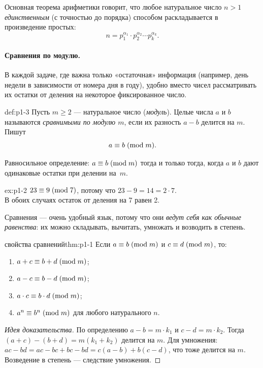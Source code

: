 Основная теорема арифметики говорит, что любое натуральное число $n > 1$ \emph{единственным} (с точностью до порядка) способом раскладывается в произведение простых:
\[
n = p_1^{\alpha_1} \cdot p_2^{\alpha_2} \cdots p_k^{\alpha_k}.
\]

\paragraph*{Сравнения по модулю.} В каждой задаче, где важна только «остаточная» информация (например, день недели в зависимости от номера дня в году), удобно вместо чисел рассматривать их остатки от деления на некоторое фиксированное число.

\begin{definition}{}{def:p1-3}
Пусть $m \ge 2$ --- натуральное число (\emph{модуль}). Целые числа $a$ и $b$ называются \emph{сравнимыми по модулю $m$}, если их разность $a - b$ делится на $m$. Пишут
\[
a \equiv b \;(\mathrm{mod}\;m).
\]
\end{definition}

\noindent
Равносильное определение: $a \equiv b \;(\mathrm{mod}\;m)$ тогда и только тогда, когда $a$ и $b$ дают одинаковые остатки при делении на~$m$.

\begin{example}{}{ex:p1-2}
$23 \equiv 9 \;(\mathrm{mod}\;7)$, потому что $23 - 9 = 14 = 2\cdot 7$.\\ В обоих случаях остаток от деления на 7 равен 2.
\end{example}

Сравнения --- очень удобный язык, потому что они \emph{ведут себя как обычные равенства}: их можно складывать, вычитать, умножать и возводить в степень.

\begin{theorem}{свойства сравнений}{thm:p1-1}
Если $a \equiv b \;(\mathrm{mod}\;m)$ и $c \equiv d \;(\mathrm{mod}\;m)$, то:
\begin{enumerate}
  \item $a + c \equiv b + d \;(\mathrm{mod}\;m)$;
  \item $a - c \equiv b - d \;(\mathrm{mod}\;m)$;
  \item $a \cdot c \equiv b \cdot d \;(\mathrm{mod}\;m)$;
  \item $a^n \equiv b^n \;(\mathrm{mod}\;m)$ для любого натурального $n$.
\end{enumerate}
\end{theorem}

\begin{proof}[Идея доказательства]
По определению $a - b = m\cdot k_1$ и $c - d = m\cdot k_2$. Тогда $(a + c) - (b + d) = m(k_1 + k_2)$ делится на $m$. Для умножения: $ac - bd = ac - bc + bc - bd = c(a-b) + b(c-d)$, что тоже делится на $m$. Возведение в степень --- следствие умножения. \qedhere
\end{proof}

